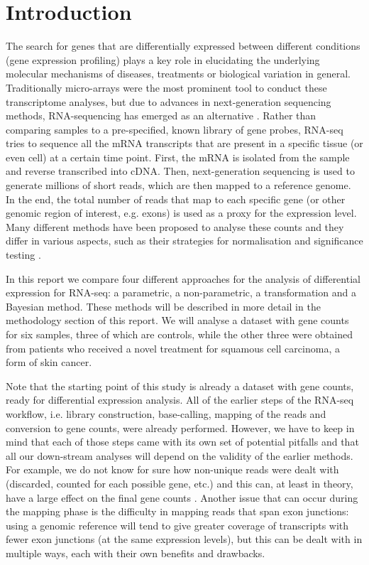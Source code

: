 \documentclass[a4paper,10pt]{article}\usepackage[]{graphicx}\usepackage[]{color}
\begin{document}
\section{Introduction}
The search for genes that are differentially expressed between different conditions (gene expression profiling) plays a key role in elucidating the underlying molecular mechanisms of diseases, treatments or biological variation in general. Traditionally micro-arrays were the most prominent tool to conduct these transcriptome analyses, but due to advances in next-generation sequencing methods, RNA-sequencing has emerged as an alternative \autocite{soneson_comparison_2013}. Rather than comparing samples to a pre-specified, known library of gene probes, RNA-seq tries to sequence all the mRNA transcripts that are present in a specific tissue (or even cell) at a certain time point. First, the mRNA is isolated from the sample and reverse transcribed into cDNA. Then, next-generation sequencing is used to generate millions of short reads, which are then mapped to a reference genome. In the end, the total number of reads that map to each specific gene (or other genomic region of interest, e.g. exons) is used as a proxy for the expression level. Many different methods have been proposed to analyse these counts and they differ in various aspects, such as their strategies for normalisation and significance testing \autocite{oshlack_rnaseq_2010}.

In this report we compare four different approaches for the analysis of differential expression for RNA-seq: a parametric, a non-parametric, a transformation and a Bayesian method. These methods will be described in more detail in the methodology section of this report. We will analyse a dataset with gene counts for six samples, three of which are controls, while the other three were obtained from patients who received a novel treatment for squamous cell carcinoma, a form of skin cancer.

Note that the starting point of this study is already a dataset with gene counts, ready for differential expression analysis. All of the earlier steps of the RNA-seq workflow, i.e. library construction, base-calling, mapping of the reads and conversion to gene counts, were already performed. However, we have to keep in mind that each of those steps came with its own set of potential pitfalls and that all our down-stream analyses will depend on the validity of the earlier methods. For example, we do not know for sure how non-unique reads were dealt with (discarded, counted for each possible gene, etc.) and this can, at least in theory, have a large effect on the final gene counts \autocite{oshlack_rnaseq_2010}. Another issue that can occur during the mapping phase is the difficulty in mapping reads that span exon junctions: using a genomic reference will tend to give greater coverage of transcripts with fewer exon junctions (at the same expression levels), but this can be dealt with in multiple ways, each with their own benefits and drawbacks.
\end{document}
